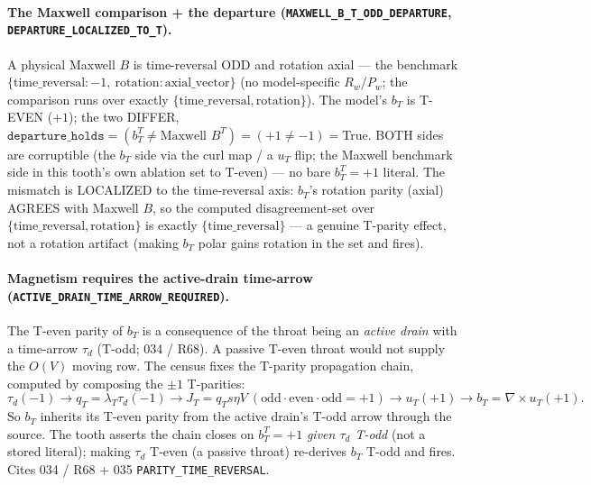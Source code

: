 \paragraph{The Maxwell comparison + the departure (\texttt{MAXWELL\_B\_T\_ODD\_DEPARTURE}, \texttt{DEPARTURE\_LOCALIZED\_TO\_T}).}
A physical Maxwell \(B\) is time-reversal ODD and rotation axial --- the benchmark
\(\{\text{time\_reversal}:-1,\ \text{rotation}:\text{axial\_vector}\}\) (no
model-specific \(R_w\)/\(P_w\); the comparison runs over exactly
\(\{\text{time\_reversal},\text{rotation}\}\)). The model's \(b_T\) is T-EVEN
(\(+1\)); the two DIFFER,
\(\texttt{departure\_holds}=(b_T^{T}\neq \text{Maxwell }B^{T})=(+1\neq-1)=\)True.
BOTH sides are corruptible (the \(b_T\) side via the curl map / a \(u_T\) flip; the
Maxwell benchmark side in this tooth's own ablation set to T-even) --- no bare
\(b_T^{T}=+1\) literal. The mismatch is LOCALIZED to the time-reversal axis:
\(b_T\)'s rotation parity (axial) AGREES with Maxwell \(B\), so the computed
disagreement-set over \(\{\text{time\_reversal},\text{rotation}\}\) is exactly
\(\{\text{time\_reversal}\}\) --- a genuine T-parity effect, not a rotation artifact
(making \(b_T\) polar gains \(\text{rotation}\) in the set and fires).

\paragraph{Magnetism requires the active-drain time-arrow (\texttt{ACTIVE\_DRAIN\_TIME\_ARROW\_REQUIRED}).}
The T-even parity of \(b_T\) is a consequence of the throat being an \emph{active
drain} with a time-arrow \(\tau_d\) (T-odd; 034 / R68). A passive T-even throat would
not supply the \(O(V)\) moving row. The census fixes the T-parity propagation chain,
computed by composing the \(\pm1\) T-parities:
\[
  \tau_d(-1)\to q_T=\lambda_T\tau_d(-1)\to J_T=q_T s\eta V\ (\text{odd}\cdot\text{even}\cdot\text{odd}=+1)
  \to u_T(+1)\to b_T=\nabla\times u_T(+1).
\]
So \(b_T\) inherits its T-even parity from the active drain's T-odd arrow through the
source. The tooth asserts the chain closes on \(b_T^{T}=+1\) \emph{given \(\tau_d\)
T-odd} (not a stored literal); making \(\tau_d\) T-even (a passive throat) re-derives
\(b_T\) T-odd and fires. Cites 034 / R68 + 035 \texttt{PARITY\_TIME\_REVERSAL}.

